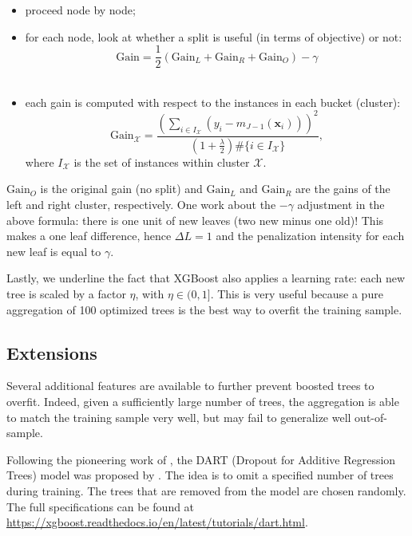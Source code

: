 \documentclass[]{krantz}
\providecommand{\tightlist}{%
  \setlength{\itemsep}{0pt}\setlength{\parskip}{0pt}}
\theoremstyle{definition}
\theoremstyle{definition}
\theoremstyle{definition}
\theoremstyle{remark}
\begin{document}
\begin{itemize}
\tightlist
\item
  proceed node by node;\\
\item
  for each node, look at whether a split is useful (in terms of
  objective) or not:
  \[\text{Gain}=\frac{1}{2}\left(\text{Gain}_L+\text{Gain}_R+\text{Gain}_O \right)-\gamma\]\\
\item
  each gain is computed with respect to the instances in each bucket
  (cluster):
  \[\text{Gain}_\mathcal{X}= \frac{\left(\sum_{i\in I_\mathcal{X}}(y_i -m_{J-1}(\mathbf{x}_i))\right)^2}{\left(1+\frac{\lambda}{2}\right)\#\{i\in I_\mathcal{X}\}},\]
  where \(I_\mathcal{X}\) is the set of instances within cluster
  \(\mathcal{X}\).
\end{itemize}

\(\text{Gain}_O\) is the original gain (no split) and \(\text{Gain}_L\)
and \(\text{Gain}_R\) are the gains of the left and right cluster,
respectively. One work about the \(-\gamma\) adjustment in the above
formula: there is one unit of new leaves (two new minus one old)! This
makes a one leaf difference, hence \(\Delta L =1\) and the penalization
intensity for each new leaf is equal to \(\gamma\).

Lastly, we underline the fact that XGBoost also applies a learning rate:
each new tree is scaled by a factor \(\eta\), with \(\eta \in (0,1]\).
This is very useful because a pure aggregation of 100 optimized trees is
the best way to overfit the training sample.

\hypertarget{boostext}{%
\subsection{Extensions}\label{boostext}}

Several additional features are available to further prevent boosted
trees to overfit. Indeed, given a sufficiently large number of trees,
the aggregation is able to match the training sample very well, but may
fail to generalize well out-of-sample.

Following the pioneering work of \citet{srivastava2014dropout}, the DART
(Dropout for Additive Regression Trees) model was proposed by
\citet{rashmi2015dart}. The idea is to omit a specified number of trees
during training. The trees that are removed from the model are chosen
randomly. The full specifications can be found at
\url{https://xgboost.readthedocs.io/en/latest/tutorials/dart.html}.
\end{document}
